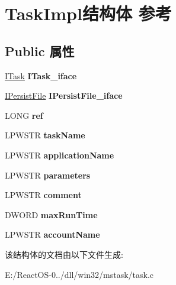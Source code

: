 \hypertarget{struct_task_impl}{}\section{Task\+Impl结构体 参考}
\label{struct_task_impl}
\subsection*{Public 属性}
\begin{DoxyCompactItemize}
\item 
\mbox{\label{struct_task_impl_a2e4ecdaa2d20bb4c91f7f6b1cf652343}} 
\hyperlink{interface_i_task}{I\+Task} {\bfseries I\+Task\+\_\+iface}
\item 
\mbox{\label{struct_task_impl_a0e2dca611c9446ae43014b586544301d}} 
\hyperlink{interface_i_persist_file}{I\+Persist\+File} {\bfseries I\+Persist\+File\+\_\+iface}
\item 
\mbox{\label{struct_task_impl_a7c9f6fc01e5f003e3ac83c97fc960af3}} 
L\+O\+NG {\bfseries ref}
\item 
\mbox{\label{struct_task_impl_abb89e2615340e8fcdd659ecc2f7ff8f4}} 
L\+P\+W\+S\+TR {\bfseries task\+Name}
\item 
\mbox{\label{struct_task_impl_a0a6a3e1e7774936ffe7b8d0c05d01fef}} 
L\+P\+W\+S\+TR {\bfseries application\+Name}
\item 
\mbox{\label{struct_task_impl_a921617f53d25fa6667740e5138c26a77}} 
L\+P\+W\+S\+TR {\bfseries parameters}
\item 
\mbox{\label{struct_task_impl_aff05f1bdd263f6d4bad87702c49a1c3f}} 
L\+P\+W\+S\+TR {\bfseries comment}
\item 
\mbox{\label{struct_task_impl_abd9096503251185c3475f632214d2a68}} 
D\+W\+O\+RD {\bfseries max\+Run\+Time}
\item 
\mbox{\label{struct_task_impl_a935dc8dfa2caab3213d673d46199de51}} 
L\+P\+W\+S\+TR {\bfseries account\+Name}
\end{DoxyCompactItemize}


该结构体的文档由以下文件生成\+:\begin{DoxyCompactItemize}
\item 
E\+:/\+React\+O\+S-\/0../dll/win32/mstask/task.\+c\end{DoxyCompactItemize}
